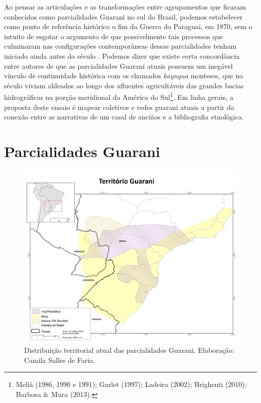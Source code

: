 \noindent
Ao pensar as articulações e as transformações entre agrupamentos que
ficaram conhecidos como parcialidades Guarani no sul do Brasil, podemos
estabelecer como ponto de referência histórico o fim da Guerra do
Paraguai, em 1870, sem o intuito de esgotar o argumento de que
possivelmente tais processos que culminaram nas configurações
contemporâneas dessas parcialidades tenham iniciado ainda antes do
século . Podemos dizer que existe certa concordância entre autores
de que as parcialidades Guarani atuais possuem um inegável vínculo de
continuidade histórica com os chamados \emph{kayngua} monteses, que no século
 viviam aldeados ao longo dos afluentes agricultáveis das grandes
bacias hidrográficas na porção meridional da América do
Sul\footnote{Melià (1986, 1990 e 1991); Garlet (1997); Ladeira (2002);
Brighenti (2010); Barbosa \& Mura (2013).}. Em linha gerais, a proposta
deste ensaio é mapear coletivos e redes guarani atuais a partir da
conexão entre as narrativas de um casal de anciãos e a bibliografia
etnológica. 

\section{Parcialidades Guarani}

\begin{figure}
  \centering
 \includegraphics[width=\textwidth]{./img/GUARANIS-img7.jpg}	
  \hfill
  \caption{Distribuição territorial atual das parcialidades Guarani. Elaboração: Camila Salles de Faria.}
\end{figure}

